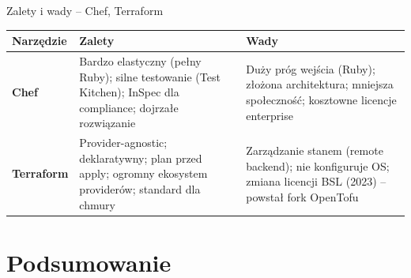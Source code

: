 \documentclass{beamer}
\begin{document}
\begin{frame}{Zalety i wady -- Chef, Terraform}
    \tiny
    \setlength{\tabcolsep}{3pt}
    \begin{tabular}{@{}p{1.8cm}p{4.8cm}p{4.8cm}@{}}
        \toprule
        \textbf{Narz\k{e}dzie}                                                                                                 & \textbf{Zalety} & \textbf{Wady} \\
        \midrule
        \textbf{Chef}                                                                                                          &
        Bardzo elastyczny (pe\l{}ny Ruby); silne testowanie (Test Kitchen); InSpec dla compliance; dojrza\l{}e rozwi\k{a}zanie &
        Du\.zy pr\'og wej\'scia (Ruby); z\l{}o\.zona architektura; mniejsza spo\l{}eczno\'s\'c; kosztowne licencje enterprise                                    \\
        \addlinespace[4pt]
        \textbf{Terraform}                                                                                                     &
        Provider-agnostic; deklaratywny; plan przed apply; ogromny ekosystem provider\'ow; standard dla chmury                 &
        Zarz\k{a}dzanie stanem (remote backend); nie konfiguruje OS; zmiana licencji BSL (2023) -- powsta\l{} fork OpenTofu                                      \\
        \bottomrule
    \end{tabular}
\end{frame}

\section{Podsumowanie}
\end{document}
